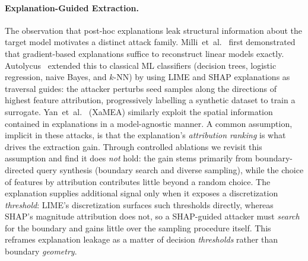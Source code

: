 \documentclass[sigconf,anonymous,review]{acmart}
\begin{document}
\paragraph{Explanation-Guided Extraction.}
The observation that post-hoc explanations leak structural information about the
target model motivates a distinct attack family.
Milli~et~al.~\cite{milli2019model} first demonstrated that gradient-based explanations
suffice to reconstruct linear models exactly.
Autolycus~\cite{oksuz2024autolycus} extended this to classical ML classifiers
(decision trees, logistic regression, naive Bayes, and $k$-NN) by using LIME and SHAP
explanations as traversal guides: the attacker perturbs seed samples along the
directions of highest feature attribution, progressively labelling a synthetic dataset
to train a surrogate. Yan~et~al.~\cite{yan2023explanationleaks} (XaMEA) similarly
exploit the spatial information contained in explanations in a model-agnostic manner.
A common assumption, implicit in these attacks, is that the explanation's
\emph{attribution ranking} is what drives the extraction gain.
Through controlled ablations we revisit this assumption and find it does \emph{not}
hold: the gain stems primarily from boundary-directed query synthesis (boundary search and diverse sampling), while the choice of features by attribution
contributes little beyond a random choice. The explanation supplies additional signal
only when it exposes a discretization \emph{threshold}: LIME's discretization surfaces such
thresholds directly, whereas SHAP's magnitude attribution does not, so a SHAP-guided
attacker must \emph{search} for the boundary and gains little over the sampling
procedure itself. This reframes explanation leakage as a matter of decision
\emph{thresholds} rather than boundary \emph{geometry}.
\end{document}
